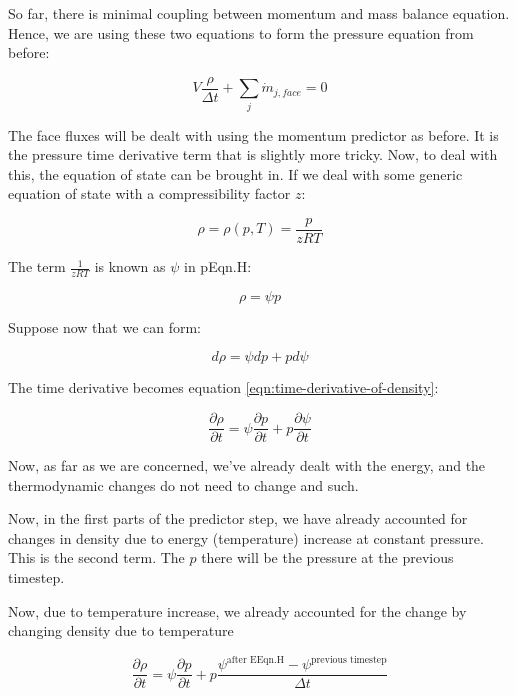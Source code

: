\documentclass[masters]{ucbthesis}
\renewcommand{\_}{\kern-1.5pt\textunderscore\kern-1.5pt}
\begin{document}
So far, there is minimal coupling between momentum and mass balance 
equation. Hence, we are using these two equations to form the pressure 
equation from before:

\begin{equation*} 
	V \frac{\rho}{\Delta t} 
	+ \sum_j \dot{m}_{j, face} = 0
\end{equation*}

The face fluxes will be dealt with using the momentum predictor as before.
It is the pressure time derivative term that is slightly more tricky. 
Now, to deal with this, the equation of state can be brought in. If we 
deal with some generic equation of state with a compressibility 
factor $z$:

\begin{equation*}
	\rho = \rho(p,T) = \frac{p}{z RT}
\end{equation*}

The term $\frac{1}{zRT}$ is known as $\psi$ in pEqn.H:

\begin{equation*}
	\rho = \psi p
\end{equation*}

Suppose now that we can form:


\begin{equation*}
	d \rho = \psi dp + p d\psi
\end{equation*}

The time derivative becomes equation \ref{eqn:time-derivative-of-density}:

\begin{equation} \label{eqn:time-derivative-of-density}
	\frac{\partial \rho}{\partial t} = \psi \frac{\partial p}{\partial t} 
	+ p \frac{\partial \psi}{\partial t}
\end{equation}

Now, as far as we are concerned, we've already dealt with the energy, and 
the thermodynamic changes do not need to change and such.

Now, in the first parts of the predictor step, we have already accounted 
for changes in density due to energy (temperature) increase at constant 
pressure. This is the second term. The $p$ there will be the pressure 
at the previous timestep.

Now, due to temperature increase, we already accounted for the change 
by changing density due to temperature

\begin{equation*}
	\frac{\partial \rho}{\partial t} = \psi \frac{\partial p}{\partial t} 
	+ p \frac{\psi^{\text{after EEqn.H}} - \psi^\text{previous timestep}}{\Delta t}
\end{equation*}
\end{document}
